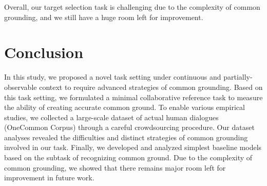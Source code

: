 Overall, our target selection task is challenging due to the complexity of common grounding, and we still have a huge room left for improvement.


\section{Conclusion}
\label{03_sec:conclusion}

In this study, we proposed a novel task setting under continuous and partially-observable context to require advanced strategies of common grounding. Based on this task setting, we formulated a minimal collaborative reference task to measure the ability of creating accurate common ground. To enable various empirical studies, we collected a large-scale dataset of actual human dialogues (OneCommon Corpus) through a careful crowdsourcing procedure. Our dataset analyses revealed the difficulties and distinct strategies of common grounding involved in our task. Finally, we developed and analyzed simplest baseline models based on the subtask of recognizing common ground. Due to the complexity of common grounding, we showed that there remains major room left for improvement in future work.
